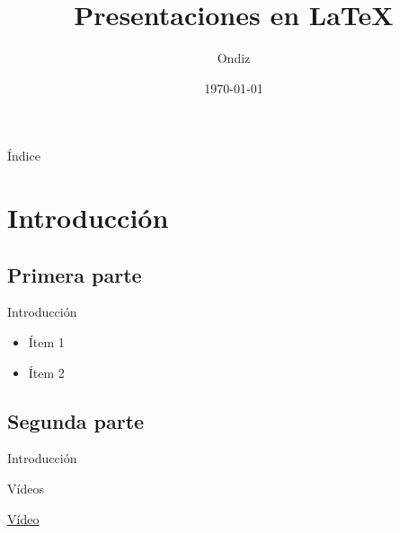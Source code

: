 \documentclass{beamer}
\title{Presentaciones en \LaTeX}
\author{Ondiz}
\institute{Home, sweet home}
\date{\today}
\begin{document}
 
 \begin{frame}
  \maketitle
 \end{frame}
 
 \begin{frame}{Índice}
  \tableofcontents
 \end{frame}
 
 \section{Introducción}
 \subsection{Primera parte}

 \begin{frame}{Introducción}
  \begin{itemize}
   \item<1-> Ítem 1
   \item<2-> Ítem 2
  \end{itemize}
 \end{frame}
 
 \subsection{Segunda parte}
 
   \begin{frame}{Introducción}
     \begin{block}{Vídeos}
      
      \href{run:popeye.mp4}{Vídeo}
     \end{block}

   \end{frame}
 
\end{document}
